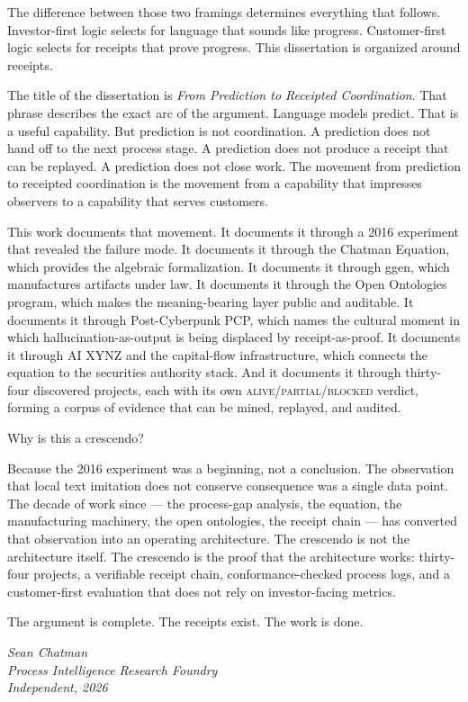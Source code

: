 The difference between those two framings determines everything that follows. Investor-first logic selects for language that sounds like progress. Customer-first logic selects for receipts that prove progress. This dissertation is organized around receipts.

\medskip

The title of the dissertation is \textit{From Prediction to Receipted Coordination}. That phrase describes the exact arc of the argument. Language models predict. That is a useful capability. But prediction is not coordination. A prediction does not hand off to the next process stage. A prediction does not produce a receipt that can be replayed. A prediction does not close work. The movement from prediction to receipted coordination is the movement from a capability that impresses observers to a capability that serves customers.

This work documents that movement. It documents it through a 2016 experiment that revealed the failure mode. It documents it through the Chatman Equation, which provides the algebraic formalization. It documents it through ggen, which manufactures artifacts under law. It documents it through the Open Ontologies program, which makes the meaning-bearing layer public and auditable. It documents it through Post-Cyberpunk PCP, which names the cultural moment in which hallucination-as-output is being displaced by receipt-as-proof. It documents it through AI XYNZ and the capital-flow infrastructure, which connects the equation to the securities authority stack. And it documents it through thirty-four discovered projects, each with its own \textsc{alive}/\textsc{partial}/\textsc{blocked} verdict, forming a corpus of evidence that can be mined, replayed, and audited.

\medskip

Why is this a crescendo?

Because the 2016 experiment was a beginning, not a conclusion. The observation that local text imitation does not conserve consequence was a single data point. The decade of work since --- the process-gap analysis, the equation, the manufacturing machinery, the open ontologies, the receipt chain --- has converted that observation into an operating architecture. The crescendo is not the architecture itself. The crescendo is the proof that the architecture works: thirty-four projects, a verifiable receipt chain, conformance-checked process logs, and a customer-first evaluation that does not rely on investor-facing metrics.

The argument is complete. The receipts exist. The work is done.

\vspace{2em}
\noindent\textit{Sean Chatman}\\
\noindent\textit{Process Intelligence Research Foundry}\\
\noindent\textit{Independent, 2026}
